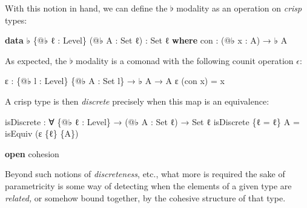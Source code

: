 \documentclass[
  12pt]{article}
\newenvironment{Shaded}{\begin{snugshade}}{\end{snugshade}}
\newcommand{\DataTypeTok}[1]{\textcolor[rgb]{0.00,0.34,0.68}{#1}}
\newcommand{\KeywordTok}[1]{\textcolor[rgb]{0.12,0.11,0.11}{\textbf{#1}}}
\newcommand{\NormalTok}[1]{\textcolor[rgb]{0.12,0.11,0.11}{#1}}
\newcommand{\OtherTok}[1]{\textcolor[rgb]{0.00,0.43,0.16}{#1}}
\begin{document}
With this notion in hand, we can define the \(\flat\) modality as an
operation on \emph{crisp} types:

\begin{Shaded}
\begin{Highlighting}[]
    \KeywordTok{data}\NormalTok{ ♭ }\OtherTok{\{@}\NormalTok{♭ ℓ }\OtherTok{:}\NormalTok{ Level}\OtherTok{\}} \OtherTok{(@}\NormalTok{♭ A }\OtherTok{:} \DataTypeTok{Set}\NormalTok{ ℓ}\OtherTok{)} \OtherTok{:} \DataTypeTok{Set}\NormalTok{ ℓ }\KeywordTok{where}
\NormalTok{        con }\OtherTok{:} \OtherTok{(@}\NormalTok{♭ x }\OtherTok{:}\NormalTok{ A}\OtherTok{)} \OtherTok{→}\NormalTok{ ♭ A}
\end{Highlighting}
\end{Shaded}

As expected, the \(\flat\) modality is a comonad with the following
counit operation \(\epsilon\):

\begin{Shaded}
\begin{Highlighting}[]
\NormalTok{    ε }\OtherTok{:} \OtherTok{\{@}\NormalTok{♭ l }\OtherTok{:}\NormalTok{ Level}\OtherTok{\}} \OtherTok{\{@}\NormalTok{♭ A }\OtherTok{:} \DataTypeTok{Set}\NormalTok{ l}\OtherTok{\}} \OtherTok{→}\NormalTok{ ♭ A }\OtherTok{→}\NormalTok{ A}
\NormalTok{    ε }\OtherTok{(}\NormalTok{con x}\OtherTok{)} \OtherTok{=}\NormalTok{ x}
\end{Highlighting}
\end{Shaded}

A crisp type is then \emph{discrete} precisely when this map is an
equivalence:

\begin{Shaded}
\begin{Highlighting}[]
\NormalTok{    isDiscrete }\OtherTok{:} \OtherTok{∀} \OtherTok{\{@}\NormalTok{♭ ℓ }\OtherTok{:}\NormalTok{ Level}\OtherTok{\}} \OtherTok{→} \OtherTok{(@}\NormalTok{♭ A }\OtherTok{:} \DataTypeTok{Set}\NormalTok{ ℓ}\OtherTok{)} \OtherTok{→} \DataTypeTok{Set}\NormalTok{ ℓ}
\NormalTok{    isDiscrete }\OtherTok{\{}\NormalTok{ℓ }\OtherTok{=}\NormalTok{ ℓ}\OtherTok{\}}\NormalTok{ A }\OtherTok{=}\NormalTok{ isEquiv }\OtherTok{(}\NormalTok{ε }\OtherTok{\{}\NormalTok{ℓ}\OtherTok{\}} \OtherTok{\{}\NormalTok{A}\OtherTok{\})}

\KeywordTok{open}\NormalTok{ cohesion}
\end{Highlighting}
\end{Shaded}

Beyond such notions of \emph{discreteness}, etc., what more is required
the sake of parametricity is some way of detecting when the elements of
a given type are \emph{related,} or somehow bound together, by the
cohesive structure of that type.
\end{document}
